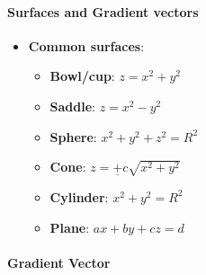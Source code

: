 \documentclass[8pt, twocolumn]{article}
\begin{document}
\paragraph{Surfaces and Gradient vectors}
\begin{itemize}
	\item \textbf{Common surfaces}:
		\begin{itemize}
			\item \textbf{Bowl/cup}: $z = x^2 + y^2$ 
			\item \textbf{Saddle}: $z = x^2 - y^2$ 
			\item \textbf{Sphere}: $x^2 + y^2 + z^2 = R^2$ 
			\item \textbf{Cone}: $z = \underline{+} c\sqrt{x^2 + y^2}$
			\item \textbf{Cylinder}: $x^2 + y^2 = R^2$ 
			\item \textbf{Plane}: $ax + by + cz = d$
		\end{itemize}
\end{itemize}

\paragraph{Gradient Vector $$}
\end{document}
